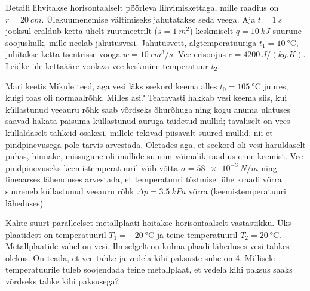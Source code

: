 \documentclass[10pt, twoside]{article}
\begin{document}
{%

Detaili lihvitakse horisontaalselt pöörleva lihvimiskettaga, mille raadius on $r = \SI{20}{cm}$. Ülekuumenemise vältimiseks jahutatakse seda veega. Aja $t = \SI{1}{s}$ jooksul eraldub ketta ühelt ruutmeetrilt ($s = \SI{1}{m^2}$) keskmiselt $q = \SI{10}{kJ}$ suurune soojushulk, mille neelab jahutusvesi. Jahutusvett, algtemperatuuriga $t_1 = \SI{10}{\degreeCelsius}$, juhitakse ketta tsentrisse vooga $w = \SI{10}{cm^3/s}$. Vee erisoojus $c = \SI{4200}{J/(kg.K)}$. Leidke üle kettaääre voolava vee keskmine temperatuur $t_2$.
\probend
\bigskip


Mari keetis Mikule teed, aga vesi läks seekord keema alles $t_0= \SI{105}{\degreeCelsius}$ juures, kuigi toas oli normaalrõhk. Milles asi? Teatavasti hakkab vesi keema siis, kui küllastunud veeauru rõhk saab võrdseks õhurõhuga ning kogu anuma ulatuses saavad hakata paisuma küllastunud auruga täidetud mullid; tavaliselt on vees küllaldaselt tahkeid osakesi, millele tekivad piisavalt suured mullid, nii et pindpinevusega pole tarvis arvestada. Oletades aga, et seekord oli vesi haruldaselt puhas, hinnake, missugune oli mullide suurim võimalik raadius enne keemist. Vee pindpinevuseks keemistemperatuuril võib võtta $\sigma = \SI{58e-3}{N/m}$ ning lineaarses lähenduses arvestada, et temperatuuri tõstmisel ühe kraadi võrra suureneb küllastunud veeauru rõhk $\Delta p = \SI{3,5}{kPa}$ võrra (keemistemperatuuri läheduses)
\probend
\bigskip


Kahte suurt paralleelset metallplaati hoitakse horisontaalselt vastastikku. Üks plaatidest on temperatuuril $T_1 = \SI{-20}{\degreeCelsius}$ ja teine temperatuuril $T_2 = \SI{20}{\degreeCelsius}$. Metallplaatide vahel on vesi. Ilmselgelt on külma plaadi läheduses vesi tahkes olekus. On teada, et vee tahke ja vedela kihi paksuste suhe on \num{4}. Millisele temperatuurile tuleb soojendada teine metallplaat, et vedela kihi paksus saaks võrdseks tahke kihi paksusega?
\probend
\bigskip


}
\end{document}
